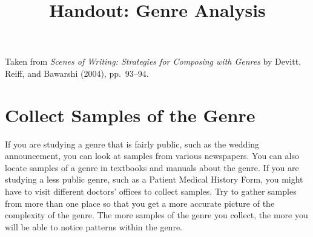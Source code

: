 \documentclass[10pt,article,oneside,twocolumn]{memoir}
\author{}
\title{Handout: Genre Analysis}%
\date{}
\begin{document}

\settitle %

{\small\noindent Taken from \emph{Scenes of Writing: Strategies for Composing with Genres} by Devitt, Reiff, and Bawarshi (2004), pp.\ 93--94.}

\settitle %
\setlistoftodos%


\label{sec:guidelines_for_analyzing_genres}

\section{Collect Samples of the Genre} %
\label{sub:collect_samples_of_the_genre}
If you are studying a genre that is fairly public, such as the wedding announcement, you can look at samples from various newspapers. You can also locate samples of a genre in textbooks and manuals about the genre. If you are studying a less public genre, such as a Patient Medical History Form, you might have to visit different doctors’ offices to collect samples. Try to gather samples from more than one place so that you get a more accurate picture of the complexity of the genre. The more samples of the genre you collect, the more you will be able to notice patterns within the genre.
\end{document}

